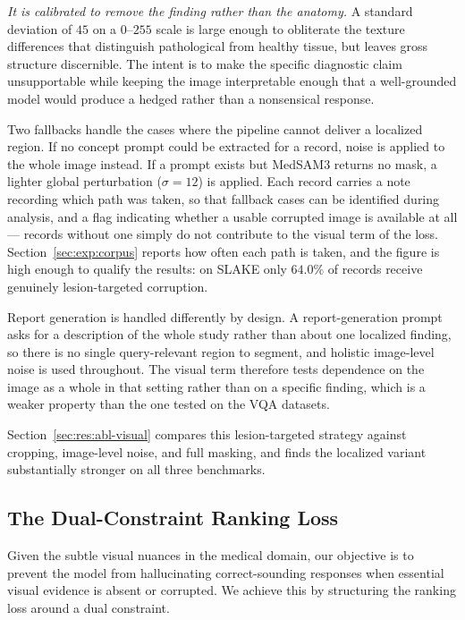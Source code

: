 \emph{It is calibrated to remove the finding rather than the anatomy.} A standard deviation of $45$ on a $0$--$255$ scale is large enough to obliterate the texture differences that distinguish pathological from healthy tissue, but leaves gross structure discernible. The intent is to make the specific diagnostic claim unsupportable while keeping the image interpretable enough that a well-grounded model would produce a hedged rather than a nonsensical response.

Two fallbacks handle the cases where the pipeline cannot deliver a localized region. If no concept prompt could be extracted for a record, noise is applied to the whole image instead. If a prompt exists but MedSAM3 returns no mask, a lighter global perturbation ($\sigma = 12$) is applied. Each record carries a note recording which path was taken, so that fallback cases can be identified during analysis, and a flag indicating whether a usable corrupted image is available at all --- records without one simply do not contribute to the visual term of the loss. Section~\ref{sec:exp:corpus} reports how often each path is taken, and the figure is high enough to qualify the results: on SLAKE only $64.0\%$ of records receive genuinely lesion-targeted corruption.

Report generation is handled differently by design. A report-generation prompt asks for a description of the whole study rather than about one localized finding, so there is no single query-relevant region to segment, and holistic image-level noise is used throughout. The visual term therefore tests dependence on the image as a whole in that setting rather than on a specific finding, which is a weaker property than the one tested on the VQA datasets.

Section~\ref{sec:res:abl-visual} compares this lesion-targeted strategy against cropping, image-level noise, and full masking, and finds the localized variant substantially stronger on all three benchmarks.

\subsection{The Dual-Constraint Ranking Loss}
\label{sec:met:ranking}

Given the subtle visual nuances in the medical domain, our objective is to prevent the model from hallucinating correct-sounding responses when essential visual evidence is absent or corrupted. We achieve this by structuring the ranking loss around a dual constraint.

